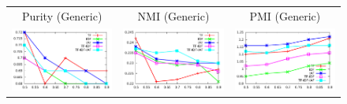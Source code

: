 \documentclass[10pt,a5paper,twoside]{article}
\begin{document}
\begin{figure}[t!]
\begin{center}
{\begin{tabular}{ccc}
		{\LARGE Purity (Generic)} & {\LARGE NMI (Generic)} & 
		{\LARGE PMI (Generic)}\\
	
		\includegraphics[width=350pt]{Figs/2-1.pdf} & 
		\includegraphics[width=350pt]{Figs/2-2.pdf} & 
		 \includegraphics[width=350pt]{Figs/2-3.pdf} \\


\end{tabular}}
\end{center}
\end{figure}
\end{document}
